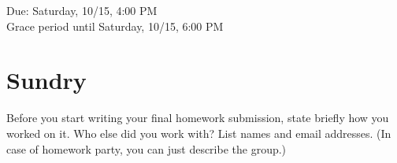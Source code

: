 \documentclass[11pt]{article}
\begin{document}
\maketitle
\fontsize{12}{15}\selectfont

\begin{center}
    Due: Saturday, 10/15, 4:00 PM \\
    Grace period until Saturday, 10/15, 6:00 PM \\
\end{center}
\normalsize
\section*{Sundry}
Before you start writing your final homework submission, state briefly how you worked on it.  Who else did you work with?  List names and email addresses.  (In case of homework party, you can just describe the group.)

\vspace{15pt}

\end{document}
